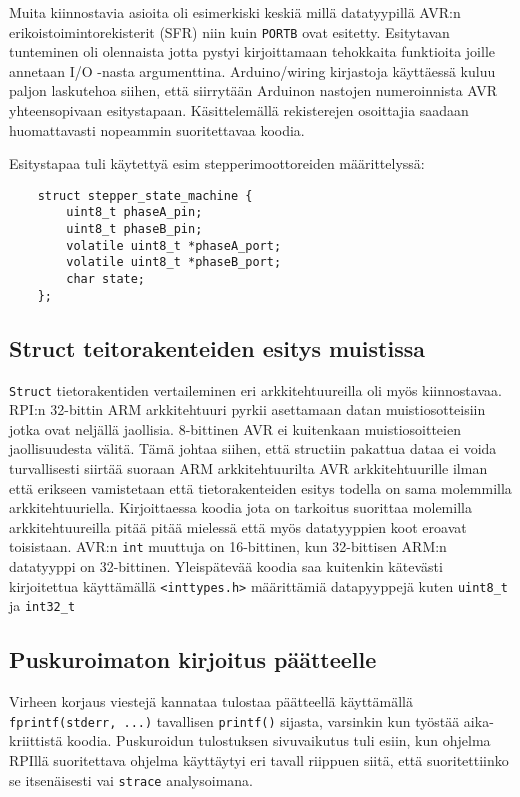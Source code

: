 \documentclass[]{article} %
\numberwithin{equation}{section}
\numberwithin{figure}{section}
\numberwithin{table}{section}
\begin{document}
Muita kiinnostavia asioita oli esimerkiski keskiä millä datatyypillä AVR:n erikoistoimintorekisterit (SFR) niin kuin \verb+PORTB+ ovat esitetty.
Esitytavan tunteminen oli olennaista jotta pystyi kirjoittamaan tehokkaita funktioita joille annetaan I/O -nasta argumenttina. Arduino/wiring kirjastoja käyttäessä kuluu paljon laskutehoa siihen, että siirrytään Arduinon nastojen numeroinnista AVR yhteensopivaan esitystapaan. Käsittelemällä rekisterejen osoittajia saadaan huomattavasti nopeammin suoritettavaa koodia.

Esitystapaa tuli käytettyä esim stepperimoottoreiden määrittelyssä:

\begin{verbatim}
    struct stepper_state_machine {
        uint8_t phaseA_pin;
        uint8_t phaseB_pin;
        volatile uint8_t *phaseA_port;
        volatile uint8_t *phaseB_port;
        char state;
    };
\end{verbatim}

\subsection{Struct teitorakenteiden esitys muistissa}

\verb+Struct+ tietorakentiden vertaileminen eri arkkitehtuureilla oli myös kiinnostavaa.
RPI:n 32-bittin ARM arkkitehtuuri pyrkii asettamaan datan muistiosotteisiin jotka ovat neljällä jaollisia. 8-bittinen AVR ei kuitenkaan muistiosoitteien jaollisuudesta välitä.
Tämä johtaa siihen, että structiin pakattua dataa ei voida turvallisesti siirtää suoraan ARM arkkitehtuurilta AVR arkkitehtuurille ilman että erikseen vamistetaan että tietorakenteiden esitys todella on sama molemmilla arkkitehtuuriella.
Kirjoittaessa koodia jota on tarkoitus suorittaa molemilla arkkitehtuureilla pitää pitää mielessä että myös datatyyppien koot eroavat toisistaan. AVR:n \verb+int+ muuttuja on 16-bittinen, kun 32-bittisen ARM:n datatyyppi on 32-bittinen.
Yleispätevää koodia saa kuitenkin kätevästi kirjoitettua käyttämällä \verb+<inttypes.h>+ määrittämiä datapyyppejä kuten \verb+uint8_t+ ja \verb+int32_t+

\subsection{Puskuroimaton kirjoitus päätteelle}
\label{sub:Puskuroimaton kirjoitus paatteelle}

Virheen korjaus viestejä kannataa tulostaa päätteellä käyttämällä \verb+fprintf(stderr, ...)+ tavallisen \verb+printf()+ sijasta, varsinkin kun työstää aika-kriittistä koodia. Puskuroidun tulostuksen sivuvaikutus tuli esiin, kun ohjelma RPIllä suoritettava ohjelma käyttäytyi eri tavall riippuen siitä, että suoritettiinko se itsenäisesti vai \verb+strace+ analysoimana. 
\end{document}
